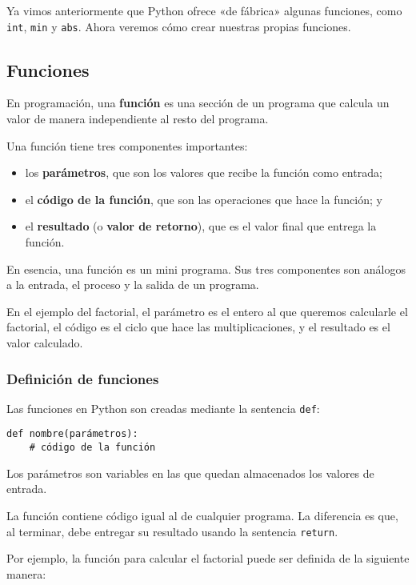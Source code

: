 Ya vimos anteriormente que Python ofrece «de fábrica» algunas funciones,
como \lstinline!int!, \lstinline!min! y \lstinline!abs!. Ahora veremos
cómo crear nuestras propias funciones.

\subsection{Funciones}

En programación, una \textbf{función} es una sección de un programa que
calcula un valor de manera independiente al resto del programa.

Una función tiene tres componentes importantes:

\begin{itemize}
\item
  los \textbf{parámetros}, que son los valores que recibe la función
  como entrada;
\item
  el \textbf{código de la función}, que son las operaciones que hace la
  función; y
\item
  el \textbf{resultado} (o \textbf{valor de retorno}), que es el valor
  final que entrega la función.
\end{itemize}

En esencia, una función es un mini programa. Sus tres componentes son
análogos a la entrada, el proceso y la salida de un programa.

En el ejemplo del factorial, el parámetro es el entero al que queremos
calcularle el factorial, el código es el ciclo que hace las
multiplicaciones, y el resultado es el valor calculado.

\subsubsection{Definición de funciones}

Las funciones en Python son creadas mediante la sentencia
\lstinline!def!:

\begin{lstlisting}
def nombre(parámetros):
    # código de la función
\end{lstlisting}

Los parámetros son variables en las que quedan almacenados los valores
de entrada.

La función contiene código igual al de cualquier programa. La diferencia
es que, al terminar, debe entregar su resultado usando la sentencia
\lstinline!return!.

Por ejemplo, la función para calcular el factorial puede ser definida de
la siguiente manera:

